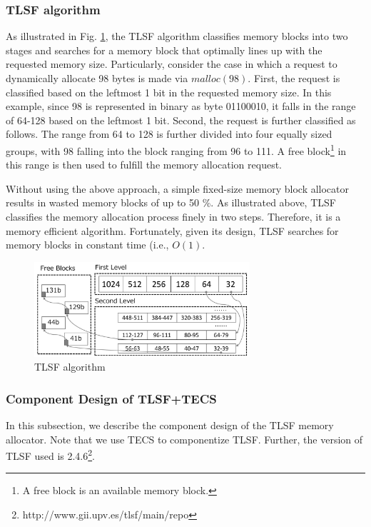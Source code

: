 \documentclass[JIP]{ipsj_v2/UTF8/ipsj}
\begin{document}
\subsubsection{TLSF algorithm}

As illustrated in Fig. \ref{fig:TLSF}, the TLSF algorithm classifies memory blocks into two stages and searches for a memory block that optimally lines up with the requested memory size.
Particularly, consider the case in which a request to dynamically allocate 98 bytes is made via $malloc(98)$.
First, the request is classified based on the leftmost 1 bit in the requested memory size.
In this example, since 98 is represented in binary as byte 01100010, it falls in the range of 64-128 based on the leftmost 1 bit.
Second, the request is further classified as follows.
The range from 64 to 128 is further divided into four equally sized groups, with 98 falling into the block ranging from 96 to 111.
A free block\footnote{A free block is an available memory block.} in this range is then used to fulfill the memory allocation request.

Without using the above approach, a simple fixed-size memory block allocator results in wasted memory blocks of up to 50 \%.
As illustrated above, TLSF classifies the memory allocation process finely in two steps.
Therefore, it is a memory efficient algorithm.
Fortunately, given its design, TLSF searches for memory blocks in constant time (i.e., $O(1)$.


\begin{figure}[t]
    \centering
    \includegraphics[width=8cm,clip]{figure/TLSF.pdf}
    \caption{TLSF algorithm}
    \label{fig:TLSF}
\end{figure}


\subsubsection{Component Design of TLSF+TECS}

In this subsection, we describe the component design of the TLSF memory allocator.
Note that we use TECS to componentize TLSF.
Further, the version of TLSF used is 2.4.6\footnote{http://www.gii.upv.es/tlsf/main/repo}.
\end{document}
